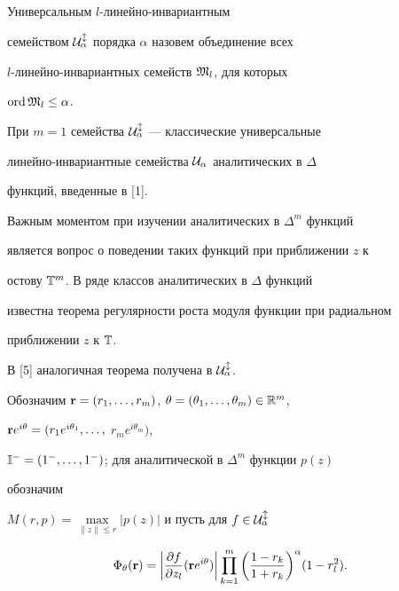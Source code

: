 \begin{defn}


Универсальным $l$-линейно-инвариантным


семейством $\cal U^l_\alpha$ порядка $\alpha$ назовем объединение всех


$l$-линейно-инвариантных семейств $\frak M_l$, для которых


$\operatorname{ord}\frak M_l \le\alpha$.


\end{defn}





При $m=1$ семейства $\cal U^l_\alpha$ --- классические универсальные


линейно-инвариантные семейства $\cal U_\alpha$ аналитических в $\Delta$


функций, введенные в [1].





Важным моментом при изучении аналитических в $\Delta^m $ функций


является вопрос о поведении таких функций при приближении $z$ к


остову $\Bbb T^m$. В ряде классов аналитических в $\Delta$ функций


известна теорема регулярности роста модуля функции при радиальном


приближении $z$ к $\Bbb T$.


В [5] аналогичная теорема получена в $\cal U^l_\alpha$.





Обозначим $\bold r=(r_1,\cd,r_m)$, $\theta =


(\theta_1,\cd,\theta_m)\in\Bbb R^m$,


$\bold r e^{i\theta}=(r_1e^{i\theta_1},\dotsc,$ $r_me^{i\theta_m})$,


$\Bbb I^-=(1^-,\dotsc,1^-)$; для аналитической в $\Delta^m$ функции $p(z)$


обозначим


$M(r,p)=\max\limits_{\|z\|\leq r}|p(z)|$ и пусть для $f\in \cal U^l_\alpha$


$$


\Phi_\theta(\bold r)=\bigg|\pol


(\bold r e^{i\theta})\bigg|


\prod_{k=1}^m\bigg(\frac{1-r_k}{1+r_k}\bigg)^\alpha (1-r_l^2).


$$





